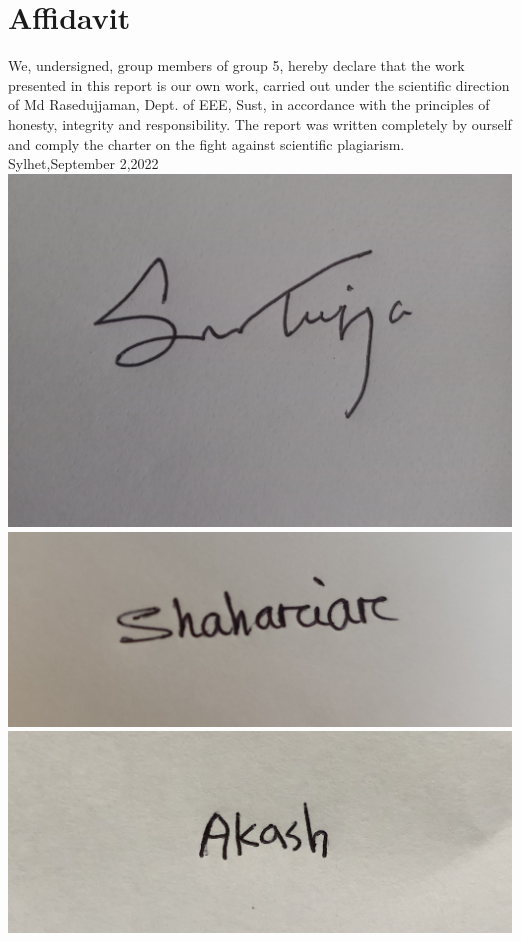 \documentclass[12pt]{article}
\begin{document}
\section{Affidavit}
\large {We, undersigned, group members of group 5, hereby declare that the work presented in this
report is our own work, carried out under the scientific direction of Md Rasedujjaman, Dept. of EEE, Sust, in accordance with the principles of honesty, integrity and responsibility.
The report was written completely by ourself and comply the charter on the fight
against scientific plagiarism.}\\
[2 cm]
\large Sylhet,September 2,2022\\
[2cm]
\includegraphics[scale=.03]{turja_latex.jpg}\\
\includegraphics[scale=.04]{saif_latex.jpg}\\
\includegraphics[scale=.07]{akash_latex.JPG}\\
\end{document}
